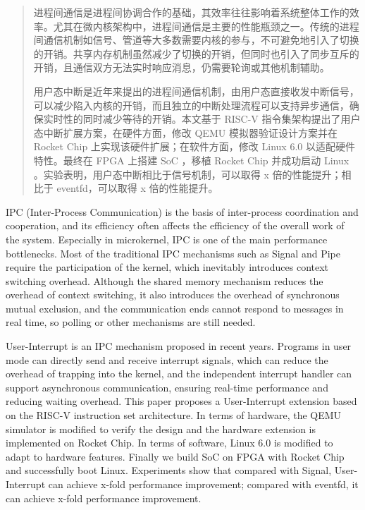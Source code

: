 
\begin{abstract}
  
  进程间通信是进程间协调合作的基础，其效率往往影响着系统整体工作的效率。尤其在微内核架构中，进程间通信是主要的性能瓶颈之一。传统的进程间通信机制如信号、管道等大多数需要内核的参与，不可避免地引入了切换的开销。共享内存机制虽然减少了切换的开销，但同时也引入了同步互斥的开销，且通信双方无法实时响应消息，仍需要轮询或其他机制辅助。
  
  用户态中断是近年来提出的进程间通信机制，由用户态直接收发中断信号，可以减少陷入内核的开销，而且独立的中断处理流程可以支持异步通信，确保实时性的同时减少等待的开销。本文基于 RISC-V 指令集架构提出了用户态中断扩展方案，在硬件方面，修改 QEMU 模拟器验证设计方案并在 Rocket Chip 上实现该硬件扩展；在软件方面，修改 Linux 6.0 以适配硬件特性。最终在 FPGA 上搭建 SoC ，移植 Rocket Chip 并成功启动 Linux 。实验表明，用户态中断相比于信号机制，可以取得 x 倍的性能提升；相比于 eventfd，可以取得 x 倍的性能提升。

\end{abstract}

\begin{abstract*}

  IPC (Inter-Process Communication) is the basis of inter-process coordination and cooperation, and its efficiency often affects the efficiency of the overall work of the system. Especially in microkernel, IPC is one of the main performance bottlenecks. Most of the traditional IPC mechanisms such as Signal and Pipe require the participation of the kernel, which inevitably introduces context switching overhead. Although the shared memory mechanism reduces the overhead of context switching, it also introduces the overhead of synchronous mutual exclusion, and the communication ends cannot respond to messages in real time, so polling or other mechanisms are still needed.
  
  User-Interrupt is an IPC mechanism proposed in recent years. Programs in user mode can directly send and receive interrupt signals, which can reduce the overhead of trapping into the kernel, and the independent interrupt handler can support asynchronous communication, ensuring real-time performance and reducing waiting overhead. This paper proposes a User-Interrupt extension based on the RISC-V instruction set architecture. In terms of hardware, the QEMU simulator is modified to verify the design and the hardware extension is implemented on Rocket Chip. In terms of software, Linux 6.0 is modified to adapt to hardware features. Finally we build SoC on FPGA with Rocket Chip and successfully boot Linux. Experiments show that compared with Signal, User-Interrupt can achieve x-fold performance improvement; compared with eventfd, it can achieve x-fold performance improvement.

\end{abstract*}

